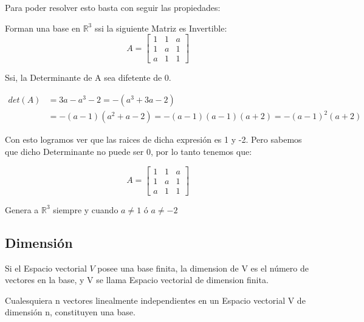 \documentclass[12pt]{report}                                %
\begin{document}
            Para poder resolver esto basta con seguir las propiedades:

            Forman una base en $\mathbb{R}^3$ ssi la siguiente Matriz es Invertible:
            \begin{equation*}
                A = \begin{bmatrix} 1 & 1 & a \\ 1 & a & 1 \\ a & 1 & 1 \end{bmatrix}
            \end{equation*}

            Ssi, la Determinante de A sea difetente de 0.

            \begin{equation*}
            \begin{split}
            det(A) & = 3a-a^3-2 = -(a^3+3a-2) \\
                   & = - (a-1)(a^2+a-2) = -(a-1)(a-1)(a+2) = -(a-1)^2(a+2)
            \end{split}
            \end{equation*}

            Con esto logramos ver que las raices de dicha expresión es 1 y -2.
            Pero sabemos que dicho Determinante no puede ser 0, por lo tanto tenemos que:

            \begin{equation*}
                A = \begin{bmatrix} 1 & 1 & a \\ 1 & a & 1 \\ a & 1 & 1 \end{bmatrix}
            \end{equation*}

            Genera a $\mathbb{R}^3$ siempre y cuando $a \neq 1$ ó $a \neq -2$ 


        \clearpage
        \subsection{Dimensión}
        Si el Espacio vectorial $V$ posee una base finita, la dimension de V es el 
        número de vectores en la base, y V se llama Espacio vectorial de dimension finita.

        Cualesquiera n vectores linealmente independientes en un Espacio
        vectorial V de dimensión n, constituyen una base.
\end{document}
